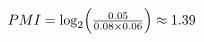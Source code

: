 \documentclass[preview]{standalone}
\begin{document}
\begin{align*}
PMI=\log_2\Bigl(\tfrac{0.05}{0.08\times0.06}\Bigr)\approx 1.39
\end{align*}
\end{document}
